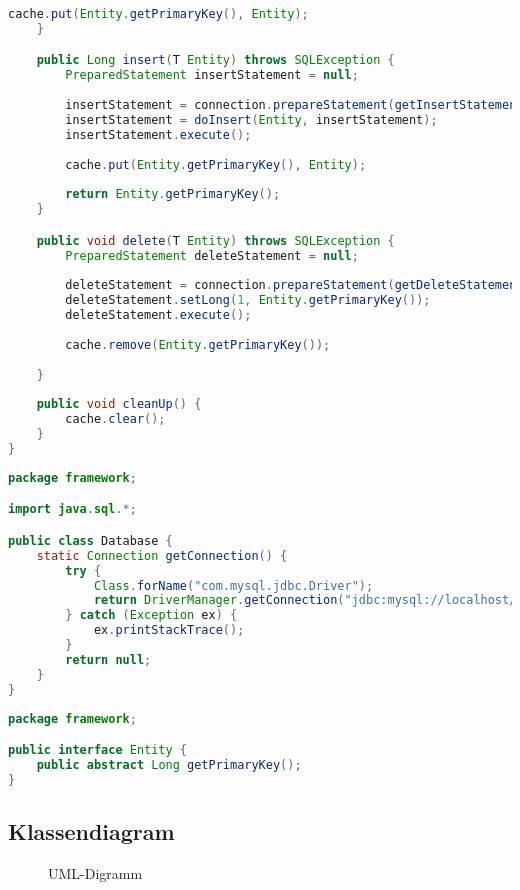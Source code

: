 \begin{lstlisting}[language=java, style=java, caption={AbstractDAO.java},
label={lst:lst3}]
        cache.put(Entity.getPrimaryKey(), Entity);
	}

	public Long insert(T Entity) throws SQLException {
		PreparedStatement insertStatement = null;
		
        insertStatement = connection.prepareStatement(getInsertStatement());
        insertStatement = doInsert(Entity, insertStatement);
        insertStatement.execute();
        
        cache.put(Entity.getPrimaryKey(), Entity);
        
        return Entity.getPrimaryKey();
	}

	public void delete(T Entity) throws SQLException {
        PreparedStatement deleteStatement = null;
        
        deleteStatement = connection.prepareStatement(getDeleteStatement());
        deleteStatement.setLong(1, Entity.getPrimaryKey());
        deleteStatement.execute();
        
        cache.remove(Entity.getPrimaryKey());
        
	}
	
	public void cleanUp() {
		cache.clear();
	}
}
\end{lstlisting}

\begin{lstlisting}[language=java, style=java, caption={Database.java},
label={lst:lst4}]
package framework;

import java.sql.*;

public class Database {
	static Connection getConnection() {
        try {
            Class.forName("com.mysql.jdbc.Driver");
            return DriverManager.getConnection("jdbc:mysql://localhost/xdb", "root", "");
        } catch (Exception ex) {
            ex.printStackTrace();
        }
        return null;
	}
}
\end{lstlisting}

\begin{lstlisting}[language=java, style=java, caption={Entity.java},
label={lst:lst5}]
package framework;

public interface Entity {
	public abstract Long getPrimaryKey();
}
\end{lstlisting}
\clearpage

\subsection{Klassendiagram}

\begin{figure}[htb]
	\centering
	\caption{UML-Digramm}
\end{figure}

